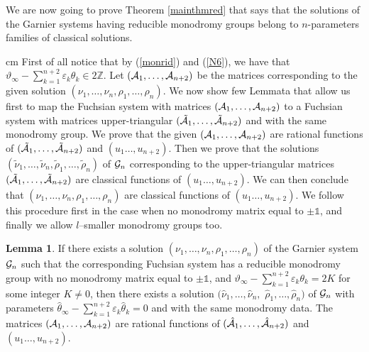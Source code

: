 \documentclass[12pt]{article}
\def\thi{{\vartheta_\infty}}
\def\eps{\varepsilon}
\newcommand{\ID}{\mathbb{1}}
\newcommand {\interi}{\mathbb Z}
\theoremstyle{definition}
\theoremstyle{theorem}
\newtheorem{lm}[df]{Lemma}
\begin{document}
We are now going to prove Theorem \ref{mainthmred} that says that
the solutions of the Garnier systems having reducible monodromy groups
belong to $n$-parameters families of classical solutions.

 cm
 First of all 
notice that by (\ref{monrid}) and (\ref{N6}), we have that 
$\thi-\sum_{k=1}^{n+2}\eps_k\theta_k\in2\interi$. 
Let $({\cal A}_1,\dots,{\cal A}_{n+2})$ be the matrices corresponding
to the given solution $(\nu_1,\dots,\nu_n,\rho_1,\dots,\rho_n)$.
We now show few Lemmata that allow us first to map the Fuchsian
system with matrices $({\cal A}_1,\dots,{\cal A}_{n+2})$ to a 
Fuchsian system with matrices upper-triangular 
$(\tilde{\cal A}_1,\dots,\tilde{\cal A}_{n+2})$ and
with the same monodromy group. We prove that the given 
$({\cal A}_1,\dots,{\cal A}_{n+2})$ are rational functions of 
$(\tilde{\cal A}_1,\dots,\tilde{\cal A}_{n+2})$ and 
$(u_1\dots,u_{n+2})$. Then we prove that the solutions
$(\tilde\nu_1,\dots,\tilde\nu_n,\tilde\rho_1,\dots,\tilde\rho_n)$
of ${\cal G}_{n}$ corresponding to the upper-triangular matrices
$(\tilde{\cal A}_1,\dots,\tilde{\cal A}_{n+2})$ are classical 
functions of $(u_1\dots,u_{n+2})$. We can then conclude 
that $(\nu_1,\dots,\nu_n,\rho_1,\dots,\rho_n)$ are classical 
functions of $(u_1\dots,u_{n+2})$. We follow this procedure first in the 
case when no monodromy matrix equal to $\pm\ID$, and finally we allow
$l$--smaller monodromy groups too.

\begin{lm}
If there exists a solution $(\nu_1,\dots,\nu_n,\rho_1,\dots,\rho_n)$
of the Garnier system ${\cal G}_{n}$ such that the corresponding 
Fuchsian system has a reducible monodromy group with no monodromy
matrix equal to $\pm\ID$, and 
$\thi-\sum_{k=1}^{n+2}\eps_k\theta_k=2 K$ for some integer
$K\neq0$, then there exists a solution
$(\hat\nu_1,\dots,\hat\nu_n,$ $\hat\rho_1,\dots,\hat\rho_n)$
of ${\cal G}_{n}$ with parameters 
$\hat{\theta}_\infty-\sum_{k=1}^{n+2}\eps_k\hat\theta_k=0$
and with the same monodromy data. The matrices
$({\cal A}_1,\dots,{\cal A}_{n+2})$ are rational functions of
$(\hat{\cal A}_1,\dots,\hat{\cal A}_{n+2})$ and $(u_1\dots,u_{n+2})$.
\label{lmb2}\end{lm}
\end{document}

